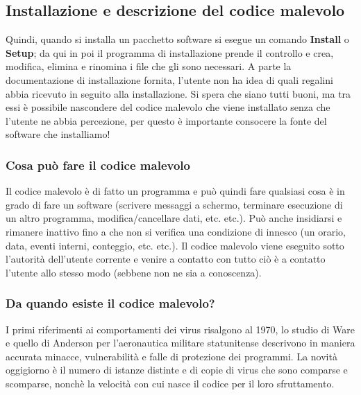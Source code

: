 \subsection{Installazione e descrizione del codice malevolo}
Quindi, quando si installa un pacchetto software si esegue un comando \textbf{Install} o \textbf{Setup}; da qui in poi il programma di installazione prende il controllo e crea, modifica, elimina e rinomina i file che gli sono necessari.
\newline
A parte la documentazione di installazione fornita, l'utente non ha idea di quali regalini abbia ricevuto in seguito alla installazione. Si spera che siano tutti buoni, ma tra essi è possibile nascondere del codice malevolo che viene installato senza che l'utente ne abbia percezione, per questo è importante consocere la fonte del software che installiamo!

\subsubsection{Cosa può fare il codice malevolo}
Il codice malevolo è di fatto un programma e può quindi fare qualsiasi cosa è in grado di fare un software (scrivere messaggi a schermo, terminare esecuzione di un altro programma, modifica/cancellare dati, etc. etc.).
Può anche insidiarsi e rimanere inattivo fino a che non si verifica una condizione di innesco (un orario, data, eventi interni, conteggio, etc. etc.).
Il codice malevolo viene eseguito sotto l'autorità dell'utente corrente e venire a contatto con tutto ciò è a contatto l'utente allo stesso modo (sebbene non ne sia a conoscenza).
\subsubsection{Da quando esiste il codice malevolo?}
I primi riferimenti ai comportamenti dei virus risalgono al 1970, lo studio di Ware e quello di Anderson per l'aeronautica militare statunitense descrivono in maniera accurata minacce, vulnerabilità e falle di protezione dei programmi.
La novità oggigiorno è il numero di istanze distinte e di copie di virus che sono comparse e scomparse, nonchè la velocità con cui nasce il codice per il loro sfruttamento.

